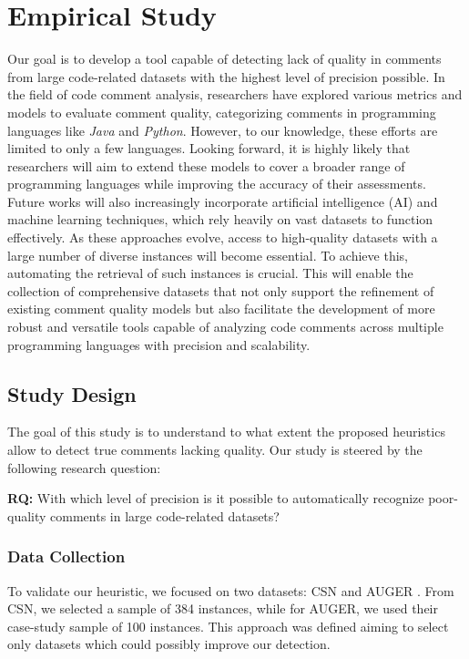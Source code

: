 
\chapter{Empirical Study} %

\label{Chapter4}


Our goal is to develop a tool capable of detecting lack of quality in comments from large code-related datasets with the highest level of precision possible. In the field of code comment analysis, researchers have explored various metrics and models to evaluate comment quality, categorizing comments in programming languages like \textit{Java} and \textit{Python}. However, to our knowledge, these efforts are limited to only a few languages.
Looking forward, it is highly likely that researchers will aim to extend these models to cover a broader range of programming languages while improving the accuracy of their assessments. Future works will also increasingly incorporate artificial intelligence (AI) and machine learning techniques, which rely heavily on vast datasets to function effectively. As these approaches evolve, access to high-quality datasets with a large number of diverse instances will become essential.
To achieve this, automating the retrieval of such instances is crucial. This will enable the collection of comprehensive datasets that not only support the refinement of existing comment quality models but also facilitate the development of more robust and versatile tools capable of analyzing code comments across multiple programming languages with precision and scalability.

\section{Study Design}
The goal of this study is to understand to what extent the proposed heuristics allow to detect true comments lacking quality. Our study is steered by the following research
question:
\begin{large}
	\begin{Center}
		\textbf{RQ:} With which level of precision is it possible to automatically recognize poor-quality comments in large code-related datasets?
	\end{Center}
\end{large}

\subsection{Data Collection}
To validate our heuristic, we focused on two datasets: CSN \cite{CSN} and AUGER \cite{AUGER}. From CSN, we selected a sample of 384 instances, while for AUGER, we used their case-study sample of 100 instances. This approach was defined aiming to select only datasets which could possibly improve our detection.

